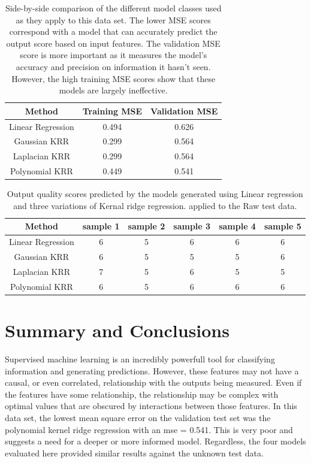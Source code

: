 \documentclass[11pt]{amsart}
\begin{document}
\begin{table}[H]
    \centering
    \begin{tabular}{|c|c|c|}
        \hline
        Method & Training MSE & Validation MSE \\ \hline
        Linear Regression & 0.494 & 0.626 \\
        Gaussian KRR & 0.299 & 0.564 \\
        Laplacian KRR & 0.299 & 0.564 \\
        Polynomial KRR & 0.449 & 0.541 \\ \hline
    \end{tabular}
    \caption{Side-by-side comparison of the different model classes used as they apply to this data set. The lower MSE scores 
    correspond with a model that can accurately predict the output score based on input features. The validation MSE score is more 
    important as it measures the model's accuracy and precision on information it hasn't seen. However, the high training MSE scores show 
    that these models are largely ineffective.}
    \label{tab:error-table}
\end{table}

\begin{table}[H]
    \centering
    \begin{tabular}{|c|c|c|c|c|c|}
        \hline
        Method & sample 1 & sample 2 & sample 3 & sample 4 & sample 5\\ \hline
        Linear Regression & 6 & 5 & 6 & 6 & 6 \\
        Gaussian KRR & 6 & 5 & 5 & 5 & 6 \\
        Laplacian KRR & 7 & 5 & 6 & 5 & 5 \\
        Polynomial KRR & 6 & 5 & 6 & 6 & 6 \\\hline
    \end{tabular}
    \caption{Output quality scores predicted by the models generated using Linear regression and three variations of Kernal ridge regression.
    applied to the Raw test data.}
    \label{tab:unknown-test-scores}
\end{table}

\section{Summary and Conclusions}\label{sec:conclusions}

Supervised machine learning is an incredibly powerfull tool for classifying information and generating predictions. However, 
these features may not have a causal, or even correlated, relationship with the outputs being measured. Even if the features have 
some relationship, the relationship may be complex with optimal values that are obscured by interactions between those features. 
In this data set, the lowest mean square error on the validation test set was the polynomial kernel ridge regression with an mse = 0.541. 
This is very poor and suggests a need for a deeper or more informed model. Regardless, the four models evaluated here provided similar results 
against the unknown test data.\\
\end{document}
